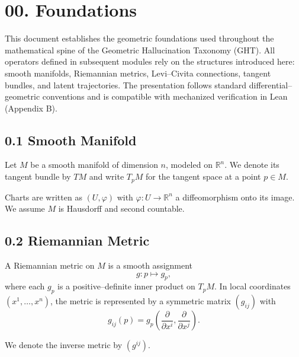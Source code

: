 
\section*{00. Foundations}

This document establishes the geometric foundations used throughout the
mathematical spine of the Geometric Hallucination Taxonomy (GHT). All
operators defined in subsequent modules rely on the structures introduced
here: smooth manifolds, Riemannian metrics, Levi–Civita connections,
tangent bundles, and latent trajectories. The presentation follows
standard differential–geometric conventions and is compatible with
mechanized verification in Lean (Appendix B).

\subsection*{0.1 Smooth Manifold}

Let $M$ be a smooth manifold of dimension $n$, modeled on $\mathbb{R}^n$.
We denote its tangent bundle by $TM$ and write $T_p M$ for the tangent
space at a point $p \in M$.

Charts are written as $(U, \varphi)$ with $\varphi : U \to \mathbb{R}^n$
a diffeomorphism onto its image. We assume $M$ is Hausdorff and second
countable.

\subsection*{0.2 Riemannian Metric}

A Riemannian metric on $M$ is a smooth assignment
\[
g : p \mapsto g_p,
\]
where each $g_p$ is a positive–definite inner product on $T_p M$.
In local coordinates $(x^1, \dots, x^n)$, the metric is represented by
a symmetric matrix $(g_{ij})$ with
\[
g_{ij}(p) = g_p\!\left( \frac{\partial}{\partial x^i},
                       \frac{\partial}{\partial x^j} \right).
\]

We denote the inverse metric by $(g^{ij})$.

